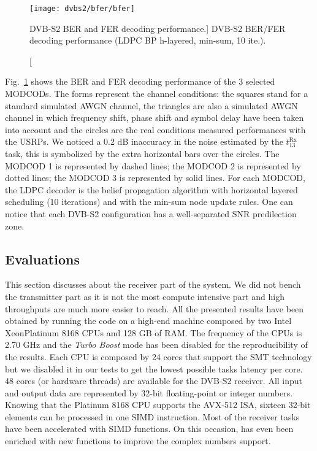 \begin{figure}[htp]
  \centering
  \texttt{[image: dvbs2/bfer/bfer]}
  \caption
    [DVB-S2 BER and FER decoding performance.]
    {DVB-S2 BER/FER decoding performance (LDPC BP h-layered, min-sum, 10 ite.).}
  \label{fig:dvbs2_bfer}
\end{figure}

Fig.~\ref{fig:dvbs2_bfer} shows the BER and FER decoding performance of the
3 selected MODCODs. The forms represent the channel conditions: the squares
stand for a standard simulated AWGN channel, the triangles are also a simulated
AWGN channel in which frequency shift, phase shift and symbol delay have been
taken into account and the circles are the real conditions measured performances
with the USRPs. We noticed a 0.2 dB inaccuracy in the noise estimated by the
$t^\text{Rx}_{13}$ task, this is symbolized by the extra horizontal bars over
the circles. The {\color{Paired-1} MODCOD 1} is represented by dashed lines; the
{\color{Paired-3} MODCOD 2} is represented by dotted lines; the
{\color{Paired-5} MODCOD 3} is represented by solid lines. For each MODCOD, the
LDPC decoder is the belief propagation algorithm with horizontal layered
scheduling (10 iterations) and with the min-sum node update rules. One can
notice that each DVB-S2 configuration has a well-separated SNR predilection
zone.

\subsection{Evaluations}

This section discusses about the receiver part of the system. We did not bench
the transmitter part as it is not the most compute intensive part and high
throughputs are much more easier to reach. All the presented results have been
obtained by running the code on a high-end machine composed by two Intel\R
Xeon\TM Platinum 8168 CPUs and 128 GB of RAM. The frequency of the CPUs is 2.70
GHz and the \emph{Turbo Boost} mode has been disabled for the reproducibility of
the results. Each CPU is composed by 24 cores that support the SMT technology
but we disabled it in our tests to get the lowest possible tasks latency per
core. 48 cores (or hardware threads) are available for the DVB-S2 receiver. All
input and output data are represented by 32-bit floating-point or integer
numbers. Knowing that the Platinum 8168 CPU supports the AVX-512 ISA, sixteen
32-bit elements can be processed in one SIMD instruction. Most of the receiver
tasks have been accelerated with \MIPP SIMD functions. On this occasion, \MIPP
has even been enriched with new functions to improve the complex numbers
support.

